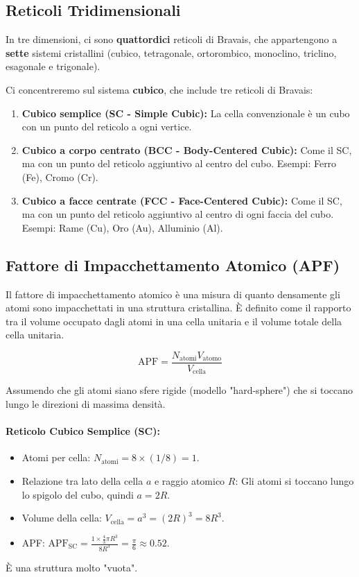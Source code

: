 \subsection{Reticoli Tridimensionali}

In tre dimensioni, ci sono \textbf{quattordici} reticoli di Bravais, che appartengono a \textbf{sette} sistemi cristallini (cubico, tetragonale, ortorombico, monoclino, triclino, esagonale e trigonale).

Ci concentreremo sul sistema \textbf{cubico}, che include tre reticoli di Bravais:
\begin{enumerate}
    \item \textbf{Cubico semplice (SC - Simple Cubic):} La cella convenzionale è un cubo con un punto del reticolo a ogni vertice.
    \item \textbf{Cubico a corpo centrato (BCC - Body-Centered Cubic):} Come il SC, ma con un punto del reticolo aggiuntivo al centro del cubo. Esempi: Ferro (Fe), Cromo (Cr).
    \item \textbf{Cubico a facce centrate (FCC - Face-Centered Cubic):} Come il SC, ma con un punto del reticolo aggiuntivo al centro di ogni faccia del cubo. Esempi: Rame (Cu), Oro (Au), Alluminio (Al).
\end{enumerate}

\subsection{Fattore di Impacchettamento Atomico (APF)}

Il fattore di impacchettamento atomico è una misura di quanto densamente gli atomi sono impacchettati in una struttura cristallina. È definito come il rapporto tra il volume occupato dagli atomi in una cella unitaria e il volume totale della cella unitaria.

\begin{equation}
 \text{APF} = \frac{N_{\text{atomi}} V_{\text{atomo}}}{V_{\text{cella}}}
\end{equation}

Assumendo che gli atomi siano sfere rigide (modello "hard-sphere") che si toccano lungo le direzioni di massima densità.

\paragraph{Reticolo Cubico Semplice (SC):}
\begin{itemize}
    \item Atomi per cella: $N_{\text{atomi}} = 8 \times (1/8) = 1$.
    \item Relazione tra lato della cella $a$ e raggio atomico $R$: Gli atomi si toccano lungo lo spigolo del cubo, quindi $a = 2R$.
    \item Volume della cella: $V_{\text{cella}} = a^3 = (2R)^3 = 8R^3$.
    \item APF: $\text{APF}_{\text{SC}} = \frac{1 \times \frac{4}{3}\pi R^3}{8R^3} = \frac{\pi}{6} \approx 0.52$.
\end{itemize}
È una struttura molto "vuota".


